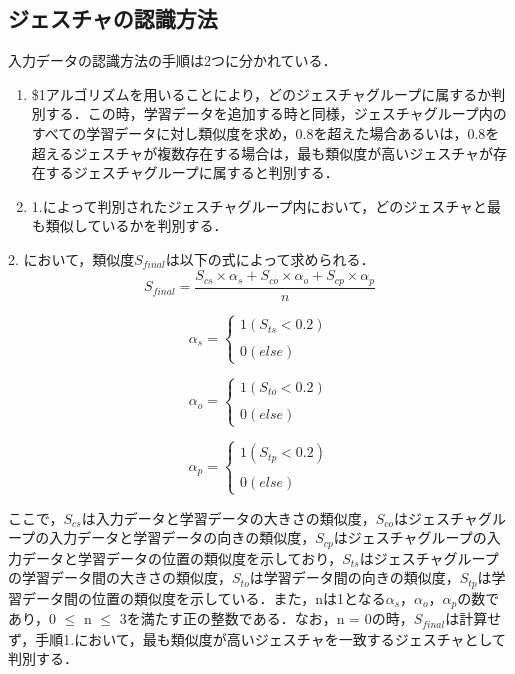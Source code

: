 \subsection{ジェスチャの認識方法}
入力データの認識方法の手順は2つに分かれている．
\begin{enumerate}
\item \$1アルゴリズムを用いることにより，どのジェスチャグループに属するか判別する．この時，学習データを追加する時と同様，ジェスチャグループ内のすべての学習データに対し類似度を求め，0.8を超えた場合あるいは，0.8を超えるジェスチャが複数存在する場合は，最も類似度が高いジェスチャが存在するジェスチャグループに属すると判別する．
\item 1.によって判別されたジェスチャグループ内において，どのジェスチャと最も類似しているかを判別する．
\end{enumerate}
2. において，類似度$S_\textit{final}$は以下の式によって求められる．
\begin{equation}
S_\textit{final} = \frac{S_\textit{cs} \times α_\textit{s} + S_\textit{co} \times α_\textit{o} + S_\textit{cp} \times α_\textit{p}}{n}
\end{equation}

\begin{equation}
α_\textit{s}= \left \{
\begin{array}{l}
1 (S_\textit{ts}<0.2) \\\\
0 (else)
\end{array}
\right.
\end{equation}

\begin{equation}
α_\textit{o}= \left \{
\begin{array}{l}
1 (S_\textit{to}<0.2) \\\\
0 (else)
\end{array}
\right.
\end{equation}

\begin{equation}
α_\textit{p} = \left \{
\begin{array}{l}
1 (S_\textit{tp}<0.2) \\\\
0 (else)
\end{array}
\right.
\end{equation}

ここで，$S_\textit{cs}$は入力データと学習データの大きさの類似度，$S_\textit{co}$はジェスチャグループの入力データと学習データの向きの類似度，$S_\textit{cp}$はジェスチャグループの入力データと学習データの位置の類似度を示しており，$S_\textit{ts}$はジェスチャグループの学習データ間の大きさの類似度，$S_\textit{to}$は学習データ間の向きの類似度，$S_\textit{tp}$は学習データ間の位置の類似度を示している．また，nは1となる$α_\textit{s}$，$α_\textit{o}$，$α_\textit{p}$の数であり，0 $\leq$ n $\leq$ 3を満たす正の整数である．なお，n = 0の時，$S_\textit{final}$は計算せず，手順1.において，最も類似度が高いジェスチャを一致するジェスチャとして判別する．

